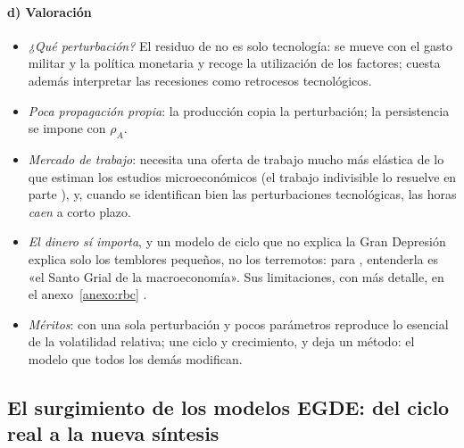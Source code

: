 \documentclass[11pt]{article}
\begin{document}
\paragraph{d) Valoración}

\begin{itemize}
\item \emph{¿Qué perturbación?} El residuo de  no es solo tecnología: se mueve con el gasto militar y la política monetaria\nocite{Hall1988} y recoge la utilización de los factores\nocite{BurnsideEichenbaumRebelo1993Labor}; cuesta además interpretar las recesiones como retrocesos tecnológicos.
\item \emph{Poca propagación propia}: la producción copia la perturbación; la persistencia se impone con $\rho_A$\nocite{CogleyNason1995Output}.
\item \emph{Mercado de trabajo}: necesita una oferta de trabajo mucho más elástica de lo que estiman los estudios microeconómicos (el trabajo indivisible lo resuelve en parte ), y, cuando se identifican bien las perturbaciones tecnológicas, las horas \emph{caen} a corto plazo\nocite{Gali1999Technology}.
\item \emph{El dinero sí importa}, y un modelo de ciclo que no explica la Gran Depresión explica solo los temblores pequeños, no los terremotos: para \textcite{Bernanke1995Macroeconomics}, entenderla es «el Santo Grial de la macroeconomía». Sus limitaciones, con más detalle, en el anexo~\ref{anexo:rbc} .
\item \emph{Méritos}: con una sola perturbación y pocos parámetros reproduce lo esencial de la volatilidad relativa; une ciclo y crecimiento, y deja un método: el modelo que todos los demás modifican\nocite{Rebelo2005Real}.
\end{itemize}

\subsection{El surgimiento de los modelos EGDE: del ciclo real a la nueva síntesis}\label{sec:surgimiento-egde}
\end{document}
